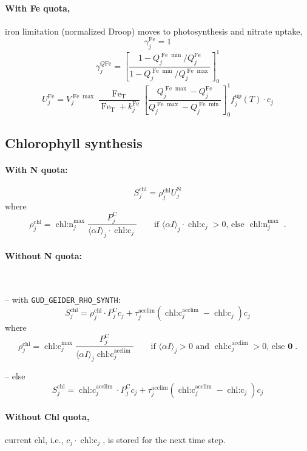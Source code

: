 \documentclass[11pt,letterpaper,english]{article}
\newcommand{\qtext}[1]{\qquad\text{#1}}
\def\|#1|{\operatorname{#1}}
\DeclareMathOperator{\Fe}{Fe}
\DeclareMathOperator{\chl}{chl}
\DeclareMathOperator{\chlc}{chl\text{:}c}
\DeclareMathOperator{\chln}{chl\text{:}n}
\DeclareMathOperator{\QFe}{\mathit{Q}Fe}
\newcommand{\N}{\mathrm{N}}
\newcommand{\C}{\mathrm{C}}
\newcommand{\total}{{\mathrm{T}}}
\newcommand{\FeT}{\Fe_\total}
\newcommand{\up}{{\text{up}}}
\newcommand{\acclim}{{\text{acclim}}}
\newcommand{\X}{c}
\begin{document}
\paragraph{With Fe quota,} iron limitation (normalized Droop) moves to
photosynthesis and nitrate uptake,
\[
  \gamma^{\Fe}_j = 1
\]
\[
  \gamma^{\QFe}_j = \left[ \frac{1 - Q^{\Fe\min}_j/Q^{\Fe}_j}
                                {1 - Q^{\Fe\min}_j/Q^{\Fe\max}_j}
                    \right]_0^1
\]
\[
  U^{\Fe}_j = V^{\Fe\max}_j \frac{\FeT}{\FeT + k^{\Fe}_j}
                \left[ \frac{Q^{\Fe\max}_j - Q^{\Fe}_j}
                            {Q^{\Fe\max}_j - Q^{\Fe\min}_j}
                \right]_0^1
           f^\up_j(T) \cdot \X_j
\]



\subsection{Chlorophyll synthesis}

\paragraph{With N quota:}
\[
  S^{\chl}_j = \rho^{\chl}_j U^\N_j
\]
where
\[
  \rho^{\chl}_j = \chln^{\max}_j \frac{P^\C_j}
                             {\langle\alpha I\rangle_j \cdot \chlc_j}
  \qtext{if } \langle\alpha I\rangle_j \cdot \chlc_j > 0
  \text{, else } \chln^{\max}_j \;.
\]

\paragraph{Without N quota:}~

-- with \verb|GUD_GEIDER_RHO_SYNTH|:
\[
  S^{\chl}_j = \rho^{\chl}_j \cdot P^\C_j \X_j
           + \tau^{\|acclim|}_j (\chlc_j^{\|acclim|} - \chlc_j) \X_j
\]
where
\[
  \rho^{\chl}_j = \chlc^{\max}_j \frac{P^\C_j}
                                {\langle\alpha I\rangle_j \chlc^\acclim_j}
  \qtext{if } \langle\alpha I\rangle_j > 0 \text{ and } \chlc^\acclim_j > 0
  \text{, else } \mathbf{0} \;.
\]

-- else
\[
  S^{\chl}_j = \chlc_j^{\|acclim|} \cdot P^\C_j \X_j
             + \tau^{\|acclim|}_j (\chlc_j^{\|acclim|} - \chlc_j) \X_j
\]

\paragraph{Without Chl quota,} current chl, i.e., $\X_j\cdot\chlc_j$,
is stored for the next time step.
\end{document}
